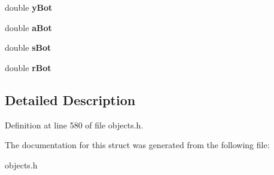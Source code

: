 \begin{DoxyCompactItemize}
double {\bfseries y\+Bot}
\item 
\mbox{\label{struct_t_xsect_a797a4131e977115049b8ca89cd036553}} 
double {\bfseries a\+Bot}
\item 
\mbox{\label{struct_t_xsect_ae13beb084549014637b1557f5b14ec2f}} 
double {\bfseries s\+Bot}
\item 
\mbox{\label{struct_t_xsect_a2db500ca54595288c53a17cd9dd77b74}} 
double {\bfseries r\+Bot}
\end{DoxyCompactItemize}


\subsection{Detailed Description}


Definition at line 580 of file objects.\+h.



The documentation for this struct was generated from the following file\+:\begin{DoxyCompactItemize}
\item 
objects.\+h\end{DoxyCompactItemize}
